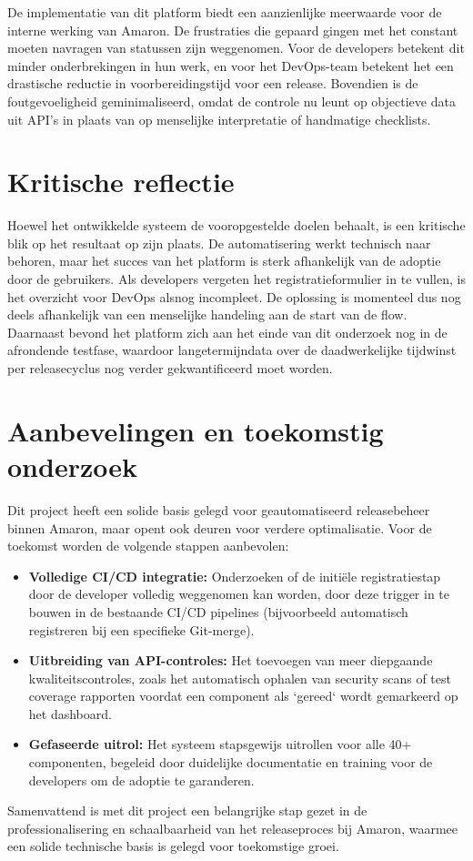 De implementatie van dit platform biedt een aanzienlijke meerwaarde voor de interne werking van Amaron. De frustraties die gepaard gingen met het constant moeten navragen van statussen zijn weggenomen. Voor de developers betekent dit minder onderbrekingen in hun werk, en voor het DevOps-team betekent het een drastische reductie in voorbereidingstijd voor een release. Bovendien is de foutgevoeligheid geminimaliseerd, omdat de controle nu leunt op objectieve data uit API's in plaats van op menselijke interpretatie of handmatige checklists.

\section{Kritische reflectie}

Hoewel het ontwikkelde systeem de vooropgestelde doelen behaalt, is een kritische blik op het resultaat op zijn plaats. De automatisering werkt technisch naar behoren, maar het succes van het platform is sterk afhankelijk van de adoptie door de gebruikers. Als developers vergeten het registratieformulier in te vullen, is het overzicht voor DevOps alsnog incompleet. De oplossing is momenteel dus nog deels afhankelijk van een menselijke handeling aan de start van de flow. Daarnaast bevond het platform zich aan het einde van dit onderzoek nog in de afrondende testfase, waardoor langetermijndata over de daadwerkelijke tijdwinst per releasecyclus nog verder gekwantificeerd moet worden.

\section{Aanbevelingen en toekomstig onderzoek}

Dit project heeft een solide basis gelegd voor geautomatiseerd releasebeheer binnen Amaron, maar opent ook deuren voor verdere optimalisatie. Voor de toekomst worden de volgende stappen aanbevolen:
\begin{itemize}
  \item \textbf{Volledige CI/CD integratie:} Onderzoeken of de initiële registratiestap door de developer volledig weggenomen kan worden, door deze trigger in te bouwen in de bestaande CI/CD pipelines (bijvoorbeeld automatisch registreren bij een specifieke Git-merge).
  \item \textbf{Uitbreiding van API-controles:} Het toevoegen van meer diepgaande kwaliteitscontroles, zoals het automatisch ophalen van security scans of test coverage rapporten voordat een component als `gereed` wordt gemarkeerd op het dashboard.
  \item \textbf{Gefaseerde uitrol:} Het systeem stapsgewijs uitrollen voor alle 40+ componenten, begeleid door duidelijke documentatie en training voor de developers om de adoptie te garanderen.
\end{itemize}

Samenvattend is met dit project een belangrijke stap gezet in de professionalisering en schaalbaarheid van het releaseproces bij Amaron, waarmee een solide technische basis is gelegd voor toekomstige groei.